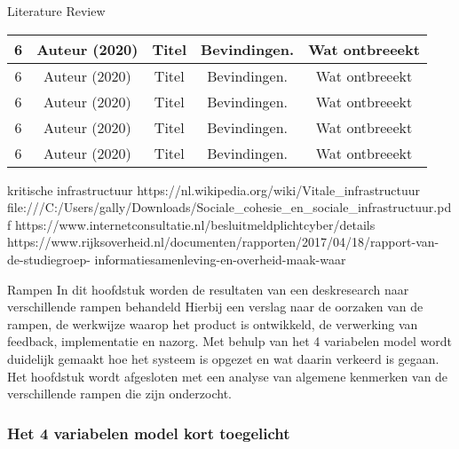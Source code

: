 \begin{frame}[shrink=40]{Literature Review}
\begin{table}[htbp]
\begin{tabular}{|c|c|c|c|c|}
			6&\multicolumn{1}{m{2cm}|}{Auteur (2020) \cite{11}}&\multicolumn{1}{m{4cm}|}{Titel}&\multicolumn{1}{m{4cm}|}{Bevindingen.}&\multicolumn{1}{m{4cm}|}{Wat ontbreeekt}\\\hline
			
			
			6&\multicolumn{1}{m{2cm}|}{Auteur (2020) \cite{11}}&\multicolumn{1}{m{4cm}|}{Titel}&\multicolumn{1}{m{4cm}|}{Bevindingen.}&\multicolumn{1}{m{4cm}|}{Wat ontbreeekt}\\\hline
			
			
			6&\multicolumn{1}{m{2cm}|}{Auteur (2020) \cite{11}}&\multicolumn{1}{m{4cm}|}{Titel}&\multicolumn{1}{m{4cm}|}{Bevindingen.}&\multicolumn{1}{m{4cm}|}{Wat ontbreeekt}\\\hline
			
			
			6&\multicolumn{1}{m{2cm}|}{Auteur (2020) \cite{11}}&\multicolumn{1}{m{4cm}|}{Titel}&\multicolumn{1}{m{4cm}|}{Bevindingen.}&\multicolumn{1}{m{4cm}|}{Wat ontbreeekt}\\\hline
			
			
			6&\multicolumn{1}{m{2cm}|}{Auteur (2020) \cite{11}}&\multicolumn{1}{m{4cm}|}{Titel}&\multicolumn{1}{m{4cm}|}{Bevindingen.}&\multicolumn{1}{m{4cm}|}{Wat ontbreeekt}\\\hline
			
			
		\end{tabular}
	\end{table}
	
\end{frame}


kritische infrastructuur
https://nl.wikipedia.org/wiki/Vitale_infrastructuur
file:///C:/Users/gally/Downloads/Sociale_cohesie_en_sociale_infrastructuur.pdf
https://www.internetconsultatie.nl/besluitmeldplichtcyber/details
https://www.rijksoverheid.nl/documenten/rapporten/2017/04/18/rapport-van-de-studiegroep-
informatiesamenleving-en-overheid-maak-waar


Rampen
In dit hoofdstuk worden de resultaten van een deskresearch naar verschillende rampen behandeld
Hierbij een verslag naar de oorzaken van de rampen, de werkwijze waarop het product is ontwikkeld, de verwerking van feedback, implementatie en nazorg.
Met behulp van het 4 variabelen model wordt duidelijk gemaakt hoe het systeem is opgezet en wat daarin verkeerd is gegaan.
Het  hoofdstuk wordt afgesloten met een analyse van algemene kenmerken van de verschillende rampen die zijn onderzocht.

\subsubsection{Het 4 variabelen model kort toegelicht}

